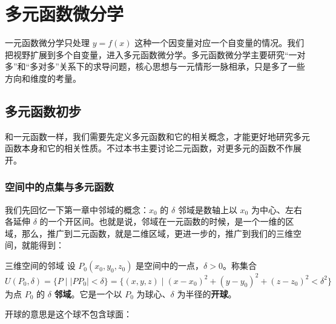 \chapter{多元函数微分学}

一元函数微分学只处理 $y=f(x)$ 这种一个因变量对应一个自变量的情况。我们把视野扩展到多个自变量，进入多元函数微分学。多元函数微分学主要研究“一对多”和“多对多”关系下的求导问题，核心思想与一元情形一脉相承，只是多了一些方向和维度的考量。

\section{多元函数初步}
和一元函数一样，我们需要先定义多元函数和它的相关概念，才能更好地研究多元函数本身和它的相关性质。不过本书主要讨论二元函数，对更多元的函数不作展开。

\subsection{空间中的点集与多元函数}

我们先回忆一下第一章中邻域的概念：$x_0$ 的 $\delta$ 邻域是数轴上以 $x_0$ 为中心、左右各延伸 $\delta$ 的一个开区间。也就是说，邻域在一元函数的时候，是一个一维的区域，那么，推广到二元函数，就是二维区域，更进一步的，推广到我们的三维空间，就能得到：

\begin{definition}{三维空间的邻域}{}
设 $P_0(x_0, y_0, z_0)$ 是空间中的一点，$\delta > 0$。称集合
\[
U(P_0, \delta) = \{ P \mid |PP_0| < \delta \} = \{ (x,y,z) \mid (x-x_0)^2 + (y-y_0)^2 + (z-z_0)^2 < \delta^2 \}
\]
为点 $P_0$ 的 $\delta$ \textbf{邻域}。它是一个以 $P_0$ 为球心、$\delta$ 为半径的\textbf{开球}。
\end{definition}

开球的意思是这个球不包含球面：

